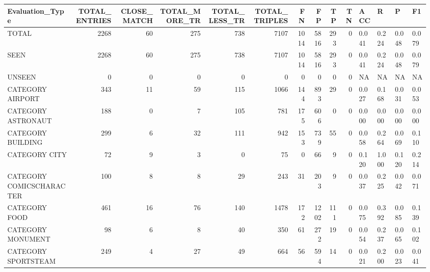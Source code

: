 \begin{tabular}{lrrrrrrrrrllll}
\hline
 Evaluation\_Type          &   TOTAL\_ENTRIES &   CLOSE\_MATCH &   TOTAL\_MORE\_TR &   TOTAL\_LESS\_TR &   TOTAL\_TRIPLES &   FN &   FP &   TP &   TN & ACC   & R     & P     & F1    \\
\hline
 TOTAL                    &            2268 &            60 &             275 &             738 &            7107 & 1014 & 5816 &  293 &    0 & 0.041 & 0.224 & 0.048 & 0.079 \\
 SEEN                     &            2268 &            60 &             275 &             738 &            7107 & 1014 & 5816 &  293 &    0 & 0.041 & 0.224 & 0.048 & 0.079 \\
 UNSEEN                   &               0 &             0 &               0 &               0 &               0 &    0 &    0 &    0 &    0 & NA    & NA    & NA    & NA    \\
 CATEGORY AIRPORT         &             343 &            11 &              59 &             115 &            1066 &  144 &  893 &   29 &    0 & 0.027 & 0.168 & 0.031 & 0.053 \\
 CATEGORY ASTRONAUT       &             188 &             0 &               7 &             105 &             781 &  175 &  606 &    0 &    0 & 0.000 & 0.000 & 0.000 & 0.000 \\
 CATEGORY BUILDING        &             299 &             6 &              32 &             111 &             942 &  153 &  739 &   55 &    0 & 0.058 & 0.264 & 0.069 & 0.110 \\
 CATEGORY CITY            &              72 &             9 &               3 &               0 &              75 &    0 &   66 &    9 &    0 & 0.120 & 1.000 & 0.120 & 0.214 \\
 CATEGORY COMICSCHARACTER &             100 &             8 &               8 &              29 &             243 &   31 &  203 &    9 &    0 & 0.037 & 0.225 & 0.042 & 0.071 \\
 CATEGORY FOOD            &             461 &            16 &              76 &             140 &            1478 &  172 & 1202 &  111 &    0 & 0.075 & 0.392 & 0.085 & 0.139 \\
 CATEGORY MONUMENT        &              98 &             6 &               8 &              40 &             350 &   61 &  272 &   19 &    0 & 0.054 & 0.237 & 0.065 & 0.102 \\
 CATEGORY SPORTSTEAM      &             249 &             4 &              27 &              49 &             664 &   56 &  594 &   14 &    0 & 0.021 & 0.200 & 0.023 & 0.041 \\

\end{tabular}
